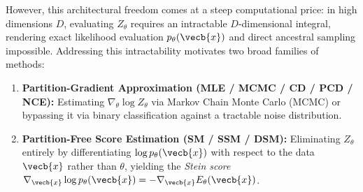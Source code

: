 \documentclass[../../../../master.tex]{subfiles}
\begin{document}
However, this architectural freedom comes at a steep computational price: in high dimensions $D$, evaluating $Z_\theta$ requires an intractable $D$-dimensional integral, rendering exact likelihood evaluation $p_\theta(\vecb{x})$ and direct ancestral sampling impossible. Addressing this intractability motivates two broad families of methods:
\begin{enumerate}
  \item \textbf{Partition-Gradient Approximation (MLE / MCMC / CD / PCD / NCE):} Estimating $\nabla_\theta \log Z_\theta$ via Markov Chain Monte Carlo (MCMC) or bypassing it via binary classification against a tractable noise distribution.
  \item \textbf{Partition-Free Score Estimation (SM / SSM / DSM):} Eliminating $Z_\theta$ entirely by differentiating $\log p_\theta(\vecb{x})$ with respect to the data $\vecb{x}$ rather than $\theta$, yielding the \emph{Stein score} $\nabla_{\vecb{x}} \log p_\theta(\vecb{x}) = -\nabla_{\vecb{x}} E_\theta(\vecb{x})$.
\end{enumerate}
\end{document}
